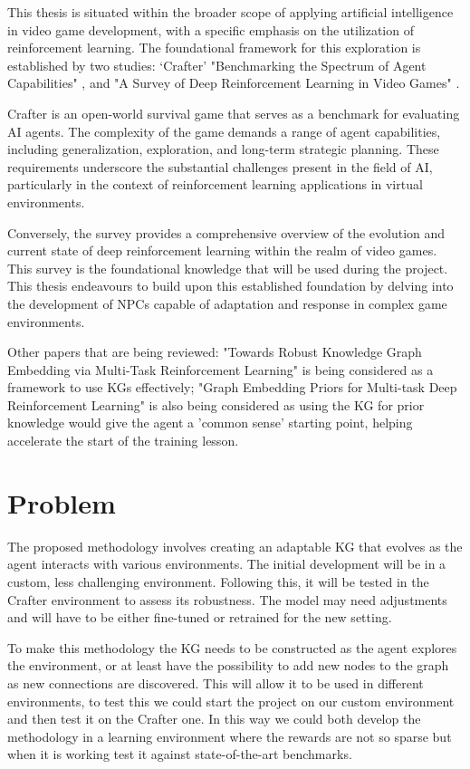This thesis is situated within the broader scope of applying artificial intelligence in video game development, with a specific emphasis on the utilization of reinforcement learning. The foundational framework for this exploration is established by two studies: ‘Crafter’ "Benchmarking the Spectrum of Agent Capabilities" \cite{Crafter}, and "A Survey of Deep Reinforcement Learning in Video Games" \cite{DRL_Survey}.

Crafter is an open-world survival game that serves as a benchmark for evaluating AI agents. The complexity of the game demands a range of agent capabilities, including generalization, exploration, and long-term strategic planning. These requirements underscore the substantial challenges present in the field of AI, particularly in the context of reinforcement learning applications in virtual environments.

Conversely, the survey provides a comprehensive overview of the evolution and current state of deep reinforcement learning within the realm of video games. This survey is the foundational knowledge that will be used during the project.
This thesis endeavours to build upon this established foundation by delving into the development of NPCs capable of adaptation and response in complex game environments. 

Other papers that are being reviewed: "Towards Robust Knowledge Graph Embedding via Multi-Task Reinforcement Learning" \cite{Robust_KG_Embedding} is being considered as a framework to use KGs effectively; "Graph Embedding Priors for Multi-task Deep Reinforcement Learning" \cite{Graph_Embedding_Priors} is also being considered as using the KG for prior knowledge would give the agent a 'common sense' starting point, helping accelerate the start of the training lesson.


\section{Problem} 

The proposed methodology involves creating an adaptable KG that evolves as the agent interacts with various environments. The initial development will be in a custom, less challenging environment. Following this, it will be tested in the Crafter environment to assess its robustness. The model may need adjustments and will have to be either fine-tuned or retrained for the new setting.

To make this methodology the KG needs to be constructed as the agent explores the environment, or at least have the possibility to add new nodes to the graph as new connections are discovered. This will allow it to be used in different environments, to test this we could start the project on our custom environment and then test it on the Crafter one. In this way we could both develop the methodology in a learning environment where the rewards are not so sparse but when it is working test it against state-of-the-art benchmarks.


